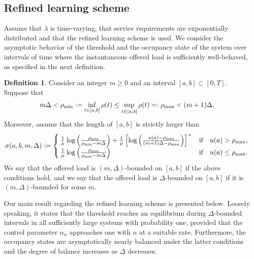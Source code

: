 \documentclass[a4paper, 12pt]{article}
\theoremstyle{definition}
\newtheorem{definition}[theorem]{Definition}
\newcommand{\defeq}{\vcentcolon=}
\newcommand{\eqdef}{=\vcentcolon}
\newcommand{\rhomin}{\rho_{\min}}
\newcommand{\rhomax}{\rho_{\max}}
\begin{document}
\subsection{Refined learning scheme}
\label{sub: refined learning scheme}

Assume that $\lambda$ is time-varying, that service requirements are exponentially distributed and that the refined learning scheme is used. We consider the asymptotic behavior of the threshold and the occupancy state of the system over intervals of time where the instantaneous offered load is sufficiently well-behaved, as specified in the next definition.

\begin{definition}
	\label{def: (Delta, m)-bounded}
	Consider an integer $m \geq 0$ and an interval $[a, b] \subset [0, T]$. Suppose that
	\begin{equation*}
		m\Delta < \rhomin \defeq \inf_{t \in [a, b]} \rho(t) \leq \sup_{t \in [a, b]} \rho(t) \eqdef \rhomax < (m + 1) \Delta.
	\end{equation*}
	Moreover, assume that the length of $[a, b]$ is strictly larger than
	\begin{equation*}
		\sigma(a, b, m, \Delta) \defeq \begin{cases}
			\frac{1}{\mu}\log \left(\frac{\rhomin}{\rhomin - m \Delta}\right) + \frac{1}{\mu}\left[\log\left(\frac{u(a) - \rhomax}{(m + 1)\Delta - \rhomax}\right)\right]^+ & \text{if} \quad u(a) > \rhomax, \\
			\frac{1}{\mu}\log\left(\frac{\rhomin}{\rhomin - m \Delta}\right) & \text{if} \quad u(a) \leq \rhomax.
		\end{cases}
	\end{equation*}
	We say that the offered load is $(m, \Delta)$-bounded on $[a, b]$ if the above conditions hold, and we say that the offered load is $\Delta$-bounded on $[a, b]$ if it is $(m, \Delta)$-bounded for some $m$.
\end{definition}

Our main result regarding the refined learning scheme is presented below. Loosely speaking, it states that the threshold reaches an equilibrium during $\Delta$-bounded intervals in all sufficiently large systems with probability one, provided that the control parameter $\alpha_n$ approaches one with $n$ at a suitable rate. Furthermore, the occupancy states are asymptotically nearly balanced under the latter conditions and the degree of balance increases as $\Delta$ decreases. 
\end{document}
